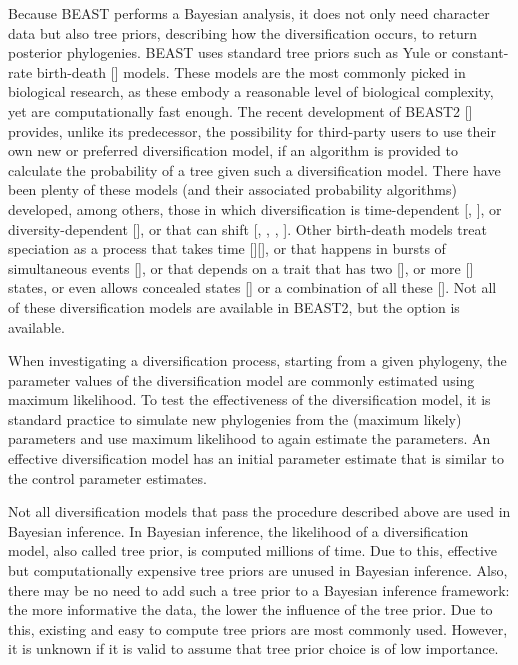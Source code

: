 \documentclass{article}
\begin{document}
Because BEAST performs a Bayesian analysis, 
it does not only need character data but also tree priors, 
describing how the diversification occurs, to return posterior phylogenies.
BEAST uses standard tree priors such as Yule or 
constant-rate birth-death [\cite{nee1994reconstructed}] models.
These models are the most commonly picked in biological research,
as these embody a reasonable level of biological complexity, 
yet are computationally fast enough.
The recent development of BEAST2 [\cite{bouckaert2014beast}] provides, 
unlike its predecessor, the possibility for third-party users 
to use their own new or preferred diversification model, 
if an algorithm is provided to calculate the probability 
of a tree given such a diversification model.
There have been plenty of these models (and their associated probability 
algorithms) 
developed, among others, those in which diversification is 
time-dependent [\cite{nee1994reconstructed}, \cite{rabosky2008explosive}], 
or diversity-dependent [\cite{etienne2011diversity}],
or that can shift [\cite{etienne2012conceptual}, 
\cite{rabosky2014automatic}, \cite{alfaro2009nine}, \cite{laudanno2018sls}].
Other birth-death models treat speciation as a process that takes 
time [\cite{rosindell2010protracted}][\cite{etienne2012prolonging}], 
or that happens in bursts of simultaneous 
events [\cite{laudanno2018mbd}], or that
depends on a trait that has two [\cite{maddison2007estimating}], 
or more [\cite{fitzjohn2012diversitree}] states,
or even allows concealed states [\cite{beaulieu2016detecting}] 
or a combination of all these [\cite{herrera2018detecting}].
Not all of these diversification models are available in BEAST2, 
but the option is available.

When investigating a diversification process,
starting from a given phylogeny, 
the parameter values of the diversification model 
are commonly estimated using maximum likelihood.
To test the effectiveness of the diversification model,
it is standard practice to simulate new phylogenies
from the (maximum likely) parameters and use maximum
likelihood to again estimate the parameters.
An effective diversification model has an
initial parameter estimate that is similar to the control parameter estimates.

Not all diversification models that pass the procedure described above
are used in Bayesian inference.
In Bayesian inference, the likelihood of a diversification 
model, also called tree prior, is computed millions of time.
Due to this, effective but computationally expensive tree priors 
are unused in Bayesian inference.
Also, there may be no need to add such a tree prior to a Bayesian
inference framework: the more informative the data, 
the lower the influence of the tree prior.
Due to this, existing and easy to compute tree priors are most commonly used.
However, it is unknown if it is valid to assume that tree prior choice is 
of low importance.
\end{document}
